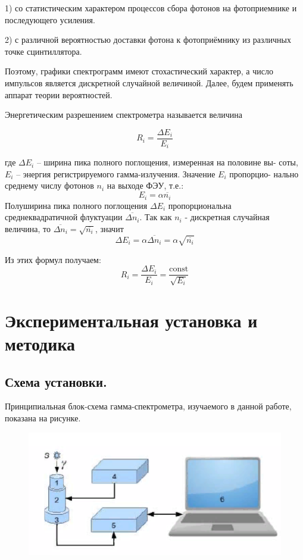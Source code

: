 \documentclass[%
 reprint,
 amsmath,amssymb,
 aps,
]{revtex4-2}
\begin{document}
1) со статистическим характером процессов сбора фотонов на фотоприемнике и последующего усиления.

2) с различной вероятностью доставки фотона к фотоприёмнику из различных точке сцинтиллятора.

Поэтому, графики спектрограмм имеют стохастический характер, а число импульсов является дискретной случайной величиной. Далее, будем применять аппарат теории вероятностей.

Энергетическим разрешением спектрометра называется величина

\begin{equation}
R_i = \frac{\Delta E_i}{E_i}
\end{equation}

где $\Delta E_i$ – ширина пика полного поглощения, измеренная на половине вы-
соты, $E_i$ – энергия регистрируемого гамма-излучения. Значение $E_i$ пропорцио-
нально среднему числу фотонов $n_i$ на выходе ФЭУ, т.е.:
\begin{equation}
E_i = \alpha\overline{n_i}
\end{equation}
Полуширина пика полного поглощения $\Delta E_i$ пропорциональна среднеквадратичной флуктуации $\overline{\Delta n_i}$. Так как $n_i$ - дискретная случайная величина, то  $\overline{\Delta n_i} = \sqrt{\overline{n_i}}$, значит 
\begin{equation}
\Delta E_i = \alpha\overline{\Delta n_i} = \alpha\sqrt{\overline{n_i}}	
\end{equation}

Из этих формул получаем:
\begin{equation}
R_i = \frac{\Delta E_i}{E_i} = \frac{\text{const}}{\sqrt{E_i}}
\end{equation}


\section{Экспериментальная установка и методика}
\subsection{Схема установки.}

Принципиальная блок-схема гамма-спектрометра, изучаемого в данной
работе, показана на рисунке.

\begin{figure}[h!]
	\includegraphics[scale=0.42]{1.png}
\end{figure}
\end{document}
